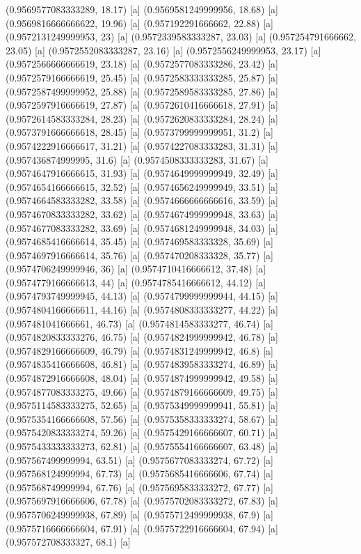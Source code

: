 {{{(0.9569577083333289, 18.17) [a] 
(0.9569581249999956, 18.68) [a] 
(0.9569816666666622, 19.96) [a] 
(0.957192291666662, 22.88) [a] 
(0.9572131249999953, 23) [a] 
(0.9572339583333287, 23.03) [a] 
(0.957254791666662, 23.05) [a] 
(0.9572552083333287, 23.16) [a] 
(0.9572556249999953, 23.17) [a] 
(0.9572566666666619, 23.18) [a] 
(0.9572577083333286, 23.42) [a] 
(0.9572579166666619, 25.45) [a] 
(0.9572583333333285, 25.87) [a] 
(0.9572587499999952, 25.88) [a] 
(0.9572589583333285, 27.86) [a] 
(0.9572597916666619, 27.87) [a] 
(0.9572610416666618, 27.91) [a] 
(0.9572614583333284, 28.23) [a] 
(0.9572620833333284, 28.24) [a] 
(0.9573791666666618, 28.45) [a] 
(0.9573799999999951, 31.2) [a] 
(0.9574222916666617, 31.21) [a] 
(0.9574227083333283, 31.31) [a] 
(0.957436874999995, 31.6) [a] 
(0.9574508333333283, 31.67) [a] 
(0.9574647916666615, 31.93) [a] 
(0.9574649999999949, 32.49) [a] 
(0.9574654166666615, 32.52) [a] 
(0.9574656249999949, 33.51) [a] 
(0.9574664583333282, 33.58) [a] 
(0.9574666666666616, 33.59) [a] 
(0.9574670833333282, 33.62) [a] 
(0.9574674999999948, 33.63) [a] 
(0.9574677083333282, 33.69) [a] 
(0.9574681249999948, 34.03) [a] 
(0.9574685416666614, 35.45) [a] 
(0.957469583333328, 35.69) [a] 
(0.9574697916666614, 35.76) [a] 
(0.957470208333328, 35.77) [a] 
(0.9574706249999946, 36) [a] 
(0.9574710416666612, 37.48) [a] 
(0.9574779166666613, 44) [a] 
(0.9574785416666612, 44.12) [a] 
(0.9574793749999945, 44.13) [a] 
(0.9574799999999944, 44.15) [a] 
(0.9574804166666611, 44.16) [a] 
(0.9574808333333277, 44.22) [a] 
(0.957481041666661, 46.73) [a] 
(0.9574814583333277, 46.74) [a] 
(0.9574820833333276, 46.75) [a] 
(0.9574824999999942, 46.78) [a] 
(0.9574829166666609, 46.79) [a] 
(0.9574831249999942, 46.8) [a] 
(0.9574835416666608, 46.81) [a] 
(0.9574839583333274, 46.89) [a] 
(0.9574872916666608, 48.04) [a] 
(0.9574874999999942, 49.58) [a] 
(0.9574877083333275, 49.66) [a] 
(0.9574879166666609, 49.75) [a] 
(0.9575114583333275, 52.65) [a] 
(0.9575349999999941, 55.81) [a] 
(0.9575354166666608, 57.56) [a] 
(0.9575358333333274, 58.67) [a] 
(0.9575420833333274, 59.26) [a] 
(0.9575429166666607, 60.71) [a] 
(0.9575433333333273, 62.81) [a] 
(0.9575554166666607, 63.48) [a] 
(0.957567499999994, 63.51) [a] 
(0.9575677083333274, 67.72) [a] 
(0.957568124999994, 67.73) [a] 
(0.9575685416666606, 67.74) [a] 
(0.957568749999994, 67.76) [a] 
(0.9575695833333272, 67.77) [a] 
(0.9575697916666606, 67.78) [a] 
(0.9575702083333272, 67.83) [a] 
(0.9575706249999938, 67.89) [a] 
(0.9575712499999938, 67.9) [a] 
(0.9575716666666604, 67.91) [a] 
(0.9575722916666604, 67.94) [a] 
(0.957572708333327, 68.1) [a] 
}}}
